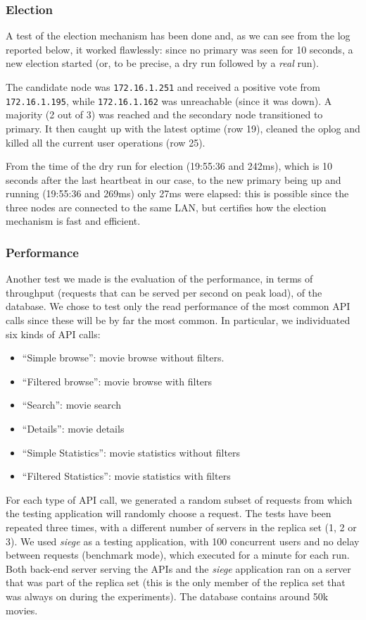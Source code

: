 \documentclass[11pt]{article}
\begin{document}
\subsubsection{Election}
A test of the election mechanism has been done and, as we can see from the log reported below, it worked flawlessly: since no primary was seen for 10 seconds, a new election started (or, to be precise, a dry run followed by a \textit{real} run).


The candidate node was \lstinline{172.16.1.251} and received a positive vote from \lstinline{172.16.1.195}, while \lstinline{172.16.1.162} was unreachable (since it was down). A majority (2 out of 3) was reached and the secondary node transitioned to primary. It then caught up with the latest optime (row 19), cleaned the oplog and killed all the current user operations (row 25).

From the time of the dry run for election (19:55:36 and 242ms), which is 10 seconds after the last heartbeat in our case, to the new primary being up and running (19:55:36 and 269ms) only 27ms were elapsed: this is possible since the three nodes are connected to the same LAN, but certifies how the election mechanism is fast and efficient.

\subsubsection{Performance}
Another test we made is the evaluation of the performance, in terms of throughput (requests that can be served per second on peak load), of the database. We chose to test only the read performance of the most common API calls since these will be by far the most common. In particular, we individuated six kinds of API calls:
\begin{itemize}
	\item ``Simple browse'': movie browse without filters.
	\item ``Filtered browse'': movie browse with filters
	\item ``Search'': movie search
	\item ``Details'': movie details
	\item ``Simple Statistics'': movie statistics without filters
	\item ``Filtered Statistics'': movie statistics with filters
\end{itemize}

For each type of API call, we generated a random subset of requests from which the testing application will randomly choose a request. 
The tests have been repeated three times, with a different number of servers in the replica set (1, 2 or 3).
We used \emph{siege} as a testing application, with 100 concurrent users and no delay between requests (benchmark mode), which executed for a minute for each run. Both back-end server serving the APIs and the \emph{siege} application ran on a server that was part of the replica set (this is the only member of the replica set that was always on during the experiments). The database contains around 50k movies.
\end{document}
